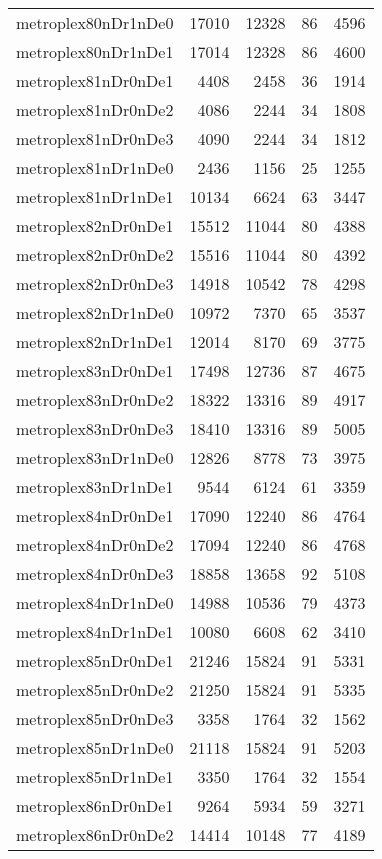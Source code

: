 \begin{tabular}{lrrrr}
metroplex80nDr1nDe0 & 17010 & 12328 & 86 & 4596 \\
metroplex80nDr1nDe1 & 17014 & 12328 & 86 & 4600 \\
metroplex81nDr0nDe1 & 4408 & 2458 & 36 & 1914 \\
metroplex81nDr0nDe2 & 4086 & 2244 & 34 & 1808 \\
metroplex81nDr0nDe3 & 4090 & 2244 & 34 & 1812 \\
metroplex81nDr1nDe0 & 2436 & 1156 & 25 & 1255 \\
metroplex81nDr1nDe1 & 10134 & 6624 & 63 & 3447 \\
metroplex82nDr0nDe1 & 15512 & 11044 & 80 & 4388 \\
metroplex82nDr0nDe2 & 15516 & 11044 & 80 & 4392 \\
metroplex82nDr0nDe3 & 14918 & 10542 & 78 & 4298 \\
metroplex82nDr1nDe0 & 10972 & 7370 & 65 & 3537 \\
metroplex82nDr1nDe1 & 12014 & 8170 & 69 & 3775 \\
metroplex83nDr0nDe1 & 17498 & 12736 & 87 & 4675 \\
metroplex83nDr0nDe2 & 18322 & 13316 & 89 & 4917 \\
metroplex83nDr0nDe3 & 18410 & 13316 & 89 & 5005 \\
metroplex83nDr1nDe0 & 12826 & 8778 & 73 & 3975 \\
metroplex83nDr1nDe1 & 9544 & 6124 & 61 & 3359 \\
metroplex84nDr0nDe1 & 17090 & 12240 & 86 & 4764 \\
metroplex84nDr0nDe2 & 17094 & 12240 & 86 & 4768 \\
metroplex84nDr0nDe3 & 18858 & 13658 & 92 & 5108 \\
metroplex84nDr1nDe0 & 14988 & 10536 & 79 & 4373 \\
metroplex84nDr1nDe1 & 10080 & 6608 & 62 & 3410 \\
metroplex85nDr0nDe1 & 21246 & 15824 & 91 & 5331 \\
metroplex85nDr0nDe2 & 21250 & 15824 & 91 & 5335 \\
metroplex85nDr0nDe3 & 3358 & 1764 & 32 & 1562 \\
metroplex85nDr1nDe0 & 21118 & 15824 & 91 & 5203 \\
metroplex85nDr1nDe1 & 3350 & 1764 & 32 & 1554 \\
metroplex86nDr0nDe1 & 9264 & 5934 & 59 & 3271 \\
metroplex86nDr0nDe2 & 14414 & 10148 & 77 & 4189 \\

\end{tabular}
